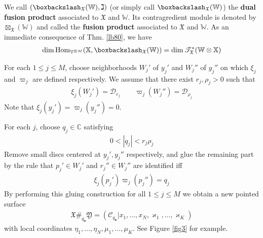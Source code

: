 \documentclass[11pt,b5paper,notitlepage]{article}
\theoremstyle{definition}
\theoremstyle{plain}
\newcommand{\fk}{\mathfrak}
\newcommand{\mc}{\mathcal}
\newcommand{\Hom}{\mathrm{Hom}}
\newcommand{\scr}{\mathscr}
\newcommand{\blt}{\bullet}
\newcommand{\Vbb}{\mathbb V}
\newcommand{\Xbb}{\mathbb X}
\newcommand{\Wbb}{\mathbb W}
\newcommand{\Cbb}{\mathbb C}
\newcommand{\<}{\left\langle}
\renewcommand{\>}{\right\rangle}
\newcommand{\fx}{\mathfrak{X}}
\newcommand{\bbs}{\boxbackslash}
\numberwithin{equation}{subsection}
\begin{document}
We call $(\bbs_\fx(\Wbb),\gimel)$ (or simply call $\bbs_\fx(\Wbb)$) the \textbf{dual fusion product} associated to $\fx$ and $\Wbb$. Its contragredient module is denoted by $\boxtimes_\fx(\Wbb)$ and called the \textbf{fusion product} associated to $\fx$ and $\Wbb$. As an immediate consequence of Thm. \ref{lb80}, we have
\begin{align}\label{eq167}
\dim\Hom_{\Vbb^{\otimes M}}(\Xbb,\bbs_\fx(\Wbb))=\dim\scr T_\fx^*(\Wbb\otimes\Xbb)
\end{align}



For each $1\leq j\leq M$, choose neighborhoods $W_j'$ of $y_j'$ and  $W_j''$ of $y_j''$ on which $\xi_j$ and $\varpi_j$ are defined respectively. We assume that there exist $r_j,\rho_j>0$ such that
\begin{align}
\xi_j(W_j')=\mc D_{r_j}\qquad \varpi_j(W_j'')=\mc D_{\rho_j}
\end{align}
Note that $\xi_j(y_j')=\varpi_j(y_j'')=0$.

For each $j$, choose $q_j\in\Cbb$ satisfying
\begin{align}
0<|q_j|<r_j\rho_j
\end{align}
Remove small discs centered at $y_j',y_j''$ respectively, and glue the remaining part by the rule that $p_j'\in W_j'$ and $r_j''\in W_j''$ are identified iff
\begin{align}
\xi_j(p_j')\varpi_j(p_j'')=q_j
\end{align} 
By performing this gluing construction for all $1\leq j\leq M$ we obtain a new pointed surface
\begin{align}
\fx\#_{q_\blt}\fk Y=(\mc C_{q_\blt}|x_1,\dots,x_N,\varkappa_1,\dots,\varkappa_K)
\end{align}
with local coordinates $\eta_1,\dots,\eta_N,\mu_1,\dots,\mu_K$. See Figure \ref{fig3} for example.
\end{document}

